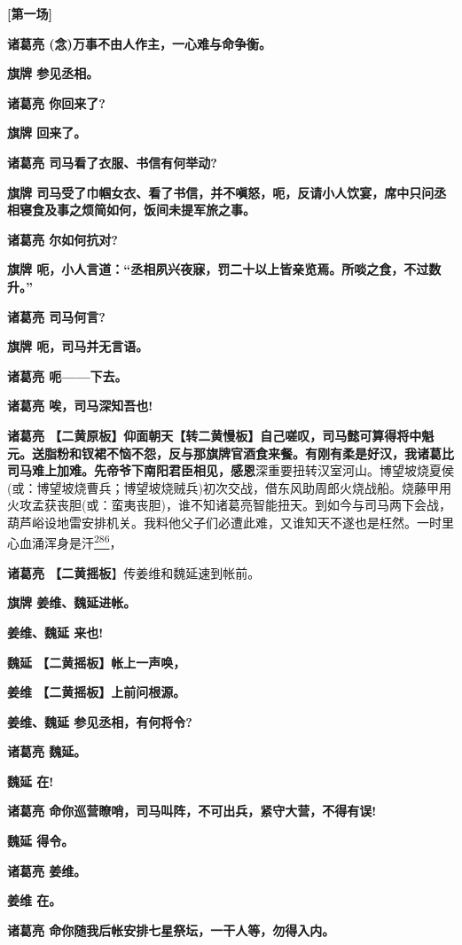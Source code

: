 \textbf{{[}第一场{]}}

\textbf{诸葛亮 (念)万事不由人作主，一心难与命争衡。}

\textbf{旗牌 参见丞相。}

\textbf{诸葛亮 你回来了?}

\textbf{旗牌 回来了。}

\textbf{诸葛亮 司马看了衣服、书信有何举动?}

\textbf{旗牌
司马受了巾帼女衣、看了书信，并不嗔怒，呃，反请小人饮宴，席中只问丞相寝食及事之烦简如何，饭间未提军旅之事。}

\textbf{诸葛亮 尔如何抗对?}

\textbf{旗牌
呃，小人言道：``丞相夙兴夜寐，罚二十以上皆亲览焉。所啖之食，不过数升。''}

\textbf{诸葛亮 司马何言?}

\textbf{旗牌 呃，司马并无言语。}

\textbf{诸葛亮 呃------下去。}

\textbf{诸葛亮 唉，司马深知吾也!}

\textbf{诸葛亮
【二黄原板】仰面朝天【转二黄慢板】自己嗟叹，司马懿可算得将中魁元。送脂粉和钗裙不恼不怨，反与那旗牌官酒食来餐。有刚有柔是好汉，我诸葛比司马难上加难。先帝爷下南阳君臣相见，感恩}深重要扭转汉室河山。博望坡烧夏侯(或：博望坡烧曹兵；博望坡烧贼兵)初次交战，借东风助周郎火烧战船。烧藤甲用火攻孟获丧胆(或：蛮夷丧胆)，谁不知诸葛亮智能扭天。到如今与司马两下会战，葫芦峪设地雷安排机关。我料他父子们必遭此难，又谁知天不遂也是枉然。一时里心血涌浑身是汗\protect\hyperlink{fn286}{\textsuperscript{286}}，

\textbf{诸葛亮 【二黄摇板}】传姜维和魏延速到帐前。

\textbf{旗牌 姜维、魏延进帐。}

\textbf{姜维、魏延 来也!}

\textbf{魏延 【二黄摇板】帐上一声唤，}

\textbf{姜维 【二黄摇板】上前问根源。}

\textbf{姜维、魏延 参见丞相，有何将令?}

\textbf{诸葛亮 魏延。}

\textbf{魏延 在!}

\textbf{诸葛亮 命你巡营瞭哨，司马叫阵，不可出兵，紧守大营，不得有误!}

\textbf{魏延 得令。}

\textbf{诸葛亮 姜维。}

\textbf{姜维 在。}

\textbf{诸葛亮 命你随我后帐安排七星祭坛，一干人等，勿得入内。}

